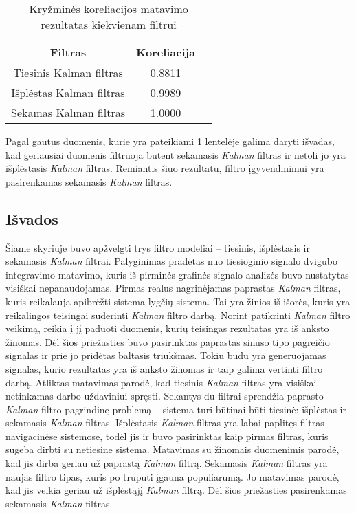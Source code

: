 \begin{table}
    \centering
    \caption{Kryžminės koreliacijos matavimo rezultatas kiekvienam filtrui}
    \label{table:kalman_filter_comparison}
    \begin{tabular}{|c|c|c|} \hline
        Filtras & Koreliacija \\ \hline
        Tiesinis Kalman filtras & 0.8811 \\ \hline
        Išplėstas Kalman filtras & 0.9989 \\ \hline
        Sekamas Kalman filtras & 1.0000 \\ \hline
    \end{tabular}
\end{table}

Pagal gautus duomenis, kurie yra pateikiami \ref{table:kalman_filter_comparison} lentelėje galima daryti išvadas, kad geriausiai duomenis filtruoja būtent sekamasis \textit{Kalman} filtras ir netoli jo yra išplėstasis \textit{Kalman} filtras.
Remiantis šiuo rezultatu, filtro įgyvendinimui yra pasirenkamas sekamasis \textit{Kalman} filtras.

\subsection{Išvados}

Šiame skyriuje buvo apžvelgti trys filtro modeliai -- tiesinis, išplėstasis ir sekamasis \textit{Kalman} filtrai.
Palyginimas pradėtas nuo tiesioginio signalo dvigubo integravimo matavimo, kuris iš pirminės grafinės signalo analizės buvo nustatytas visiškai nepanaudojamas.
Pirmas realus nagrinėjamas paprastas \textit{Kalman} filtras, kuris reikalauja apibrėžti sistema lygčių sistema.
Tai yra žinios iš išorės, kuris yra reikalingos teisingai suderinti \textit{Kalman} filtro darbą.
Norint patikrinti \textit{Kalman} filtro veikimą, reikia į jį paduoti duomenis, kurių teisingas rezultatas yra iš anksto žinomas.
Dėl šios priežasties buvo pasirinktas paprastas sinuso tipo pagreičio signalas ir prie jo pridėtas baltasis triukšmas.
Tokiu būdu yra generuojamas signalas, kurio rezultatas yra iš anksto žinomas ir taip galima vertinti filtro darbą.
Atliktas matavimas parodė, kad tiesinis \textit{Kalman} filtras yra visiškai netinkamas darbo uždaviniui spręsti.
Sekantys du filtrai sprendžia paprasto \textit{Kalman} filtro pagrindinę problemą -- sistema turi būtinai būti tiesinė: išplėstas ir sekamasis \textit{Kalman} filtras.
Išplėstasis \textit{Kalman} filtras yra labai paplitęs filtras navigacinėse sistemose, todėl jis ir buvo pasirinktas kaip pirmas filtras, kuris sugeba dirbti su netiesine sistema.
Matavimas su žinomais duomenimis parodė, kad jis dirba geriau už paprastą \textit{Kalman} filtrą.
Sekamasis \textit{Kalman} filtras yra naujas filtro tipas, kuris po truputi įgauna populiarumą.
Jo matavimas parodė, kad jis veikia geriau už išplėstąjį \textit{Kalman} filtrą.
Dėl šios priežasties pasirenkamas sekamasis \textit{Kalman} filtras.


